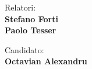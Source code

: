 \begin{titlepage}
    \begin{minipage}[t]{0.47\textwidth}
        {\large{Relatori:}{\normalsize\vspace{3mm}
                \bf\\ \large{Stefano Forti
                    \vspace{2mm}\\Paolo Tesser}}}
    \end{minipage}
    \hfill
    \begin{minipage}[t]{0.47\textwidth}\raggedleft
        {\large{Candidato:}{\normalsize\vspace{3mm} \bf\\ \large{ Octavian Alexandru\\ }}}
    \end{minipage}

    \vspace{20mm}
    \hrulefill
    \\

\end{titlepage}